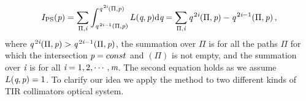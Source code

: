 \begin{equation}
I_{\textrm{PS}}(\textit{p}) = \sum_{\Pi, \textit{i} }\int_{\textit{q}^{\,2\textit{i}-1}(\Pi, \textit{p})}^{\textit{q}^{\,2\textit{i}}( \Pi, \textit{p})}L(\textit{q}, \textit{p})\textrm{d}\textit{q} =
 \sum_{\Pi, \textit{i}}\textit{q}^{\,2\textit{i}}(\Pi, \textit{p})-
\textit{q}^{\,2\textit{i}-1}( \Pi, \textit{p})\,,
\label{eq:Ips}
\end{equation}
where $\textit{q}^{\,2\textit{i}}( \Pi, \textit{p})>\textit{q}^{\,2\textit{i}-1}( \Pi, \textit{p})$, the summation over $\Pi$ is for all the paths $\Pi$ for which the intersection $\textit{p} = const$ and $(\Pi)$ is not empty, and the summation over $\textit{i}$ is for all $\textit{i} = 1,2, \cdots, \textit{m}$. The second equation holds as we assume $L(\textit{q}, \textit{p})=1$.
To clarify our idea we apply the method to two different kinds of TIR collimators optical system.
